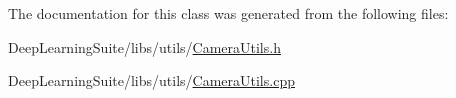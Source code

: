 The documentation for this class was generated from the following files\+:\begin{DoxyCompactItemize}
\item 
Deep\+Learning\+Suite/libs/utils/\hyperlink{_camera_utils_8h}{Camera\+Utils.\+h}\item 
Deep\+Learning\+Suite/libs/utils/\hyperlink{_camera_utils_8cpp}{Camera\+Utils.\+cpp}\end{DoxyCompactItemize}
